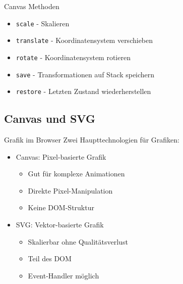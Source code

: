 \begin{code}{Canvas Methoden}
  \begin{itemize}
    \item \texttt{scale} - Skalieren
    \item \texttt{translate} - Koordinatensystem verschieben
    \item \texttt{rotate} - Koordinatensystem rotieren
    \item \texttt{save} - Transformationen auf Stack speichern
    \item \texttt{restore} - Letzten Zustand wiederherstellen
  \end{itemize}  
\end{code}

\subsection{Canvas und SVG}

\begin{concept}{Grafik im Browser}
    Zwei Haupttechnologien für Grafiken:
    \begin{itemize}
        \item Canvas: Pixel-basierte Grafik
            \begin{itemize}
                \item Gut für komplexe Animationen
                \item Direkte Pixel-Manipulation
                \item Keine DOM-Struktur
            \end{itemize}
        \item SVG: Vektor-basierte Grafik
            \begin{itemize}
                \item Skalierbar ohne Qualitätsverlust
                \item Teil des DOM
                \item Event-Handler möglich
            \end{itemize}
    \end{itemize}
\end{concept}

